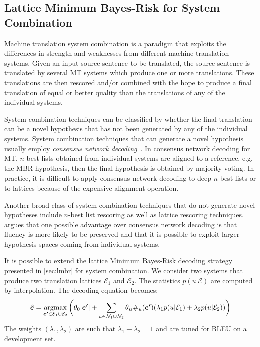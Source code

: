 
\subsection{Lattice Minimum Bayes-Risk for System Combination}
\label{sec:lmbrSysComb}

Machine translation system combination is a paradigm that exploits
the differences in strength and weaknesses from different
machine translation systems. Given an input source sentence to be
translated, the source sentence is translated by several MT systems
which produce one or more translations. These translations
are then rescored and/or combined with the hope to produce
a final translation of equal or better quality than the translations
of any of the individual systems.

System combination techniques can be classified
by whether the final translation can be a novel hypothesis
that has not been generated by any of the individual systems.
System combination techniques that can generate
a novel hypothesis usually employ
\emph{consensus network decoding}~\citep{fiscus:1997:ASRU}.
In consensus network decoding for MT, $n$-best lists
obtained from individual systems are aligned to
a reference, e.g. the MBR hypothesis, then the final
hypothesis is obtained by majority voting.
In practice, it is difficult to apply consensus network
decoding to deep $n$-best lists or to lattices because
of the expensive alignment operation.

Another broad class of system combination techniques
that do not generate novel hypotheses
include $n$-best list rescoring as well as lattice rescoring techniques.
\citet{blackwood:2010:PHD} argues that one possible advantage over
consensus network decoding
is that fluency is more likely to be preserved and that
it is possible to exploit larger hypothesis spaces coming
from individual systems.

It is possible to extend the lattice Minimum Bayes-Risk decoding strategy
presented in \autoref{sec:lmbr} for system combination.
We consider two systems that produce two translation lattices
$\mathcal{E}_1$ and $\mathcal{E}_2$. The statistics
$p(u|\mathcal{E})$ are computed by interpolation. The decoding equation becomes:
%
\begin{equation}
  \hat{\bm{e}}=\operatorname*{argmax}_{\bm{e'} \in \mathcal{E}_1 \cup \mathcal{E}_2 } \bigg ( \theta_0|\bm{e'}|+\sum_{u \in \mathcal{N}_1 \cup \mathcal{N}_2}  \theta_u\#_u(\bm{e'}) (\lambda_{1} p(u|\mathcal{E}_1) + \lambda_2 p(u|\mathcal{E}_2)) \bigg )
\end{equation}
%
The weights $(\lambda_1,\lambda_2)$ are such that $\lambda_1+\lambda_2 = 1$ and are tuned for BLEU on a development set.

